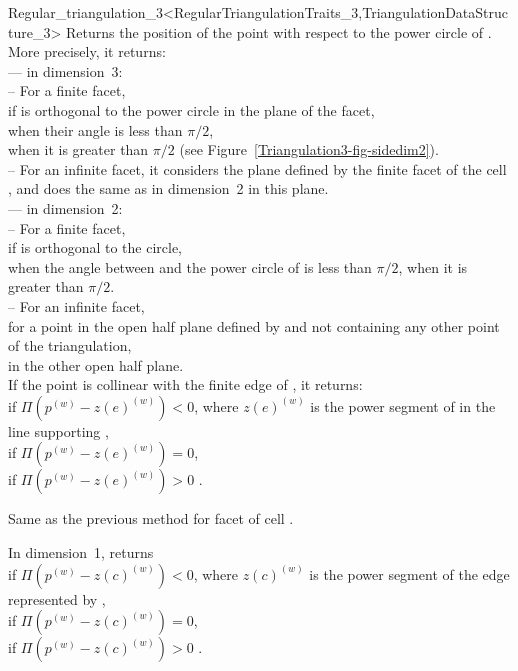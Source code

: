 \begin{ccRefClass}{Regular_triangulation_3<RegularTriangulationTraits_3,TriangulationDataStructure_3>}
{Returns the position of the point  with respect to the
power circle of . More precisely, it returns:\\
--- in dimension~3:\\
-- For a finite facet,\\
 if  is orthogonal to the power circle in the
plane of the facet,\\ 
 when their angle is less than $\pi/2$,\\
 when it is greater than $\pi/2$ (see
Figure~\ref{Triangulation3-fig-sidedim2}).\\ 
-- For an infinite facet, it considers the plane defined by the finite
facet of the cell , and does the same as in
dimension~2 in this plane.\\
--- in dimension~2:\\
-- For a finite facet,\\
 if  is orthogonal to the circle,\\
 when the angle between  and the
power circle of  is less than $\pi/2$,
 when it is greater than $\pi/2$.\\ 
-- For an infinite facet,\\
 for a point in the open half plane defined by
 and not containing any other point of the triangulation,\\
 in the other open half plane.\\
If the point  is collinear with the finite edge  of
, it returns:\\
 if $\Pi({p}^{(w)}-{z(e)}^{(w)})<0$, where
${z(e)}^{(w)}$ is the power segment of  in the line supporting
,\\ 
 if $\Pi({p}^{(w)}-{z(e)}^{(w)})=0$,\\
 if $\Pi({p}^{(w)}-{z(e)}^{(w)})>0$ .
}

{Same as the previous method for facet  of cell .}

{In dimension~1, returns\\
 if $\Pi({p}^{(w)}-{z(c)}^{(w)})<0$, where
${z(c)}^{(w)}$ is the power segment of the edge represented by
,\\
 if $\Pi({p}^{(w)}-{z(c)}^{(w)})=0$,\\
 if $\Pi({p}^{(w)}-{z(c)}^{(w)})>0$ .
}


\end{ccRefClass}
